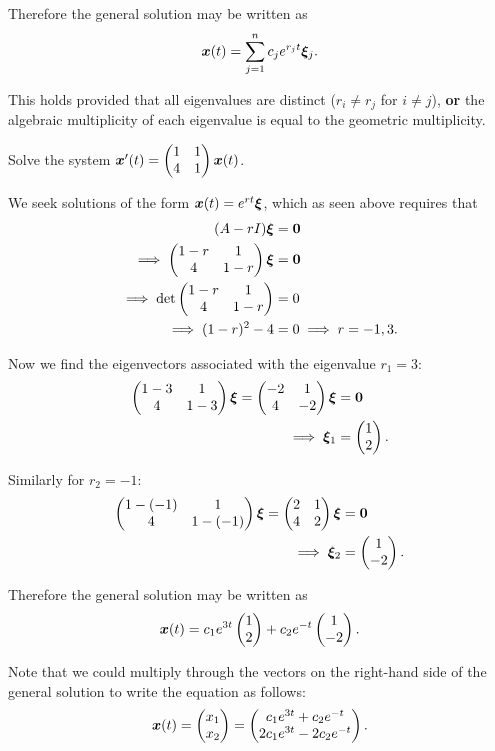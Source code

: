 Therefore the general solution may be written as
\begin{equation}\label{eq:generalsol}
	\bm{x}(t) = \sum_{j=1}^n c_j e^{r_jt} \bm{\xi}_j.
\end{equation}

This holds provided that all eigenvalues are distinct ($r_i \neq r_j$ for $i \neq j$), \textbf{or} the algebraic multiplicity of each eigenvalue is equal to the geometric multiplicity.

\begin{eg}\label{eg:constsys1}
	Solve the system $\bm{x}'(t) = \begin{pmatrix}1 & 1 \\ 4 & 1\end{pmatrix} \bm{x}(t)$.
	
	We seek solutions of the form $\bm{x}(t) = e^{rt} \bm{\xi}$, which as seen above requires that
	\begin{align*}
		(A-rI)\bm{\xi} &= \bm{0} \\
		\implies \begin{pmatrix}1-r & 1 \\ 4 & 1-r\end{pmatrix} \bm{\xi} &= \bm{0} \\
		\implies \det \begin{pmatrix}1-r & 1 \\ 4 & 1-r\end{pmatrix} &= 0 \\
		\implies (1-r)^2 -4 &= 0 \implies r = -1, 3.
	\end{align*}
	
	Now we find the eigenvectors associated with the eigenvalue $r_1=3$:
	\begin{align*}
		\begin{pmatrix}1-3 & 1 \\ 4 & 1-3\end{pmatrix} \bm{\xi} = \begin{pmatrix}-2 & 1 \\ 4 & -2\end{pmatrix} \bm{\xi} &= \bm{0} \\
		\implies \bm{\xi}_1 &= \begin{pmatrix}1 \\ 2\end{pmatrix}.
	\end{align*}
	
	Similarly for $r_2=-1$:
	\begin{align*}
		\begin{pmatrix}1-(-1) & 1 \\ 4 & 1-(-1)\end{pmatrix} \bm{\xi} = \begin{pmatrix}2 & 1 \\ 4 & 2\end{pmatrix} \bm{\xi} &= \bm{0} \\
		\implies \bm{\xi}_2 &= \begin{pmatrix}1 \\ -2\end{pmatrix}.
	\end{align*}
	
	Therefore the general solution may be written as
	\[
	\bm{x}(t) = c_1 e^{3t} \begin{pmatrix}1 \\ 2\end{pmatrix} + c_2 e^{-t} \begin{pmatrix}1 \\ -2\end{pmatrix}.
	\]
\end{eg}

\begin{remark}
	Note that we could multiply through the vectors on the right-hand side of the general solution to write the equation as follows:
	\[
	\bm{x}(t) = \begin{pmatrix}x_1 \\ x_2\end{pmatrix} = \begin{pmatrix}c_1 e^{3t} + c_2 e^{-t} \\ 2c_1 e^{3t} - 2c_2 e^{-t}\end{pmatrix}.
	\]
\end{remark}

